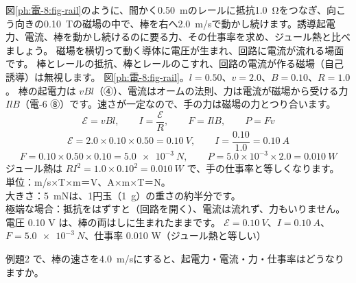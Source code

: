 \label{ph:電-8:ex2}
\begin{phreidai}[レールの上を動く棒]
図\ref{ph:電-8:fig-rail}のように、間かく\qty{0.50}{m}のレールに抵抗\qty{1.0}{\ohm}をつなぎ、向こう向きの\qty{0.10}{T}の磁場の中で、棒を右へ\qty{2.0}{m/s}で動かし続けます。誘導起電力、電流、棒を動かし続けるのに要る力、その仕事率を求め、ジュール熱と比べましょう。
\phbamen
磁場を横切って動く導体に電圧が生まれ、回路に電流が流れる場面です。
\phmushi
棒とレールの抵抗、棒とレールのこすれ、回路の電流が作る磁場（自己誘導）は無視します。
\phzu
図\ref{ph:電-8:fig-rail}。$l=0.50$、$v=2.0$、$B=0.10$、$R=1.0$。
\phriyu
棒の起電力は $vBl$（④）、電流はオームの法則、力は電流が磁場から受ける力 $IlB$（電-6 ⑧）です。速さが一定なので、手の力は磁場の力とつり合います。
\phtateru
\[ \mathcal E=vBl,\qquad I=\frac{\mathcal E}{R},\qquad F=IlB,\qquad P=Fv \]
\phtoku
\[ \mathcal E=2.0\times0.10\times0.50=\qty{0.10}{V},\qquad I=\frac{0.10}{1.0}=\qty{0.10}{A} \]
\[ F=0.10\times0.50\times0.10=\qty{5.0e-3}{N},\qquad P=5.0\times10^{-3}\times2.0=\qty{0.010}{W} \]
ジュール熱は $RI^2=1.0\times0.10^2=\qty{0.010}{W}$ で、手の仕事率と等しくなります。
\phtashikame
単位：m/s×T×m＝V、A×m×T＝N。\\
大きさ：\qty{5}{mN}は、1円玉（\qty{1}{g}）の重さの約半分です。\\
極端な場合：抵抗をはずすと（回路を開く）、電流は流れず、力もいりません。電圧 0.10 V は、棒の両はしに生まれたままです。
\kotae $\mathcal E=\qty{0.10}{V}$、$I=\qty{0.10}{A}$、$F=\qty{5.0e-3}{N}$、仕事率 0.010 W（ジュール熱と等しい）
\end{phreidai}
\begin{jibun}
例題2 で、棒の速さを\qty{4.0}{m/s}にすると、起電力・電流・力・仕事率はどうなりますか。
\end{jibun}

